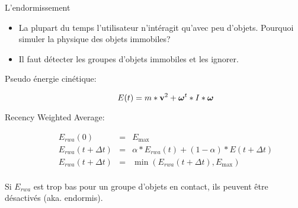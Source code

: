 \begin{frame}{L'endormissement}
    \begin{itemize}
        \item La plupart du temps l’utilisateur n’intéragit qu’avec
            peu d’objets. Pourquoi simuler la physique des objets immobiles?
        \pause
        \item Il faut détecter les groupes d’objets immobiles et les
            ignorer.
    \end{itemize}
        \pause
    \begin{description}
        \item[Pseudo énergie cinétique:]\mbox{}
            \[
                E(t) = m * {\bf v}^2 + \boldsymbol\omega^t * I * \boldsymbol\omega
            \]
        \pause
    \item[Recency Weighted Average:]\mbox{}
        \[
            \begin{array}{lcl}
                E_{rwa}(0) & = & E_{\text{max}}\\
                E_{rwa}(t + \Delta t) & = & \alpha * E_{rwa}(t) + (1 - \alpha) * E(t + \Delta t)\\
                E_{rwa}(t + \Delta t) & = & \min(E_{rwa}(t + \Delta t), E_{\text{max}})\\
            \end{array}
        \]
    \end{description}
    \pause
    Si $E_{rwa}$ est trop bas pour un groupe d’objets en contact, ils peuvent
    être désactivés (aka. endormis).
\end{frame}

